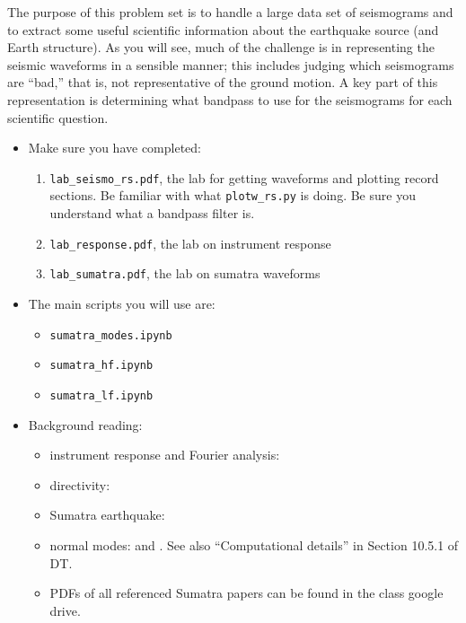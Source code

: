 \documentclass[11pt,titlepage,fleqn]{article}
\begin{document}
\begin{spacing}{1.0}

The purpose of this problem set is to handle a large data set of seismograms and to extract some useful scientific information about the earthquake source (and Earth structure). As you will see, much of the challenge is in representing the seismic waveforms in a sensible manner; this includes judging which seismograms are ``bad,'' that is, not representative of the ground motion. A key part of this representation is determining what bandpass to use for the seismograms for each scientific question.

\begin{itemize}


\item Make sure you have completed:
%
\begin{enumerate}
\item \verb+lab_seismo_rs.pdf+, the lab for getting waveforms and plotting record sections.
Be familiar with what \verb+plotw_rs.py+ is doing.
Be sure you understand what a bandpass filter is.

\item \verb+lab_response.pdf+, the lab on instrument response

\item \verb+lab_sumatra.pdf+, the lab on sumatra waveforms
\end{enumerate}


\item The main scripts you will use are:
%
\begin{itemize}
\item \verb+sumatra_modes.ipynb+
\item \verb+sumatra_hf.ipynb+
\item \verb+sumatra_lf.ipynb+
\end{itemize}


\item Background reading:

\begin{itemize}
\item instrument response and Fourier analysis: \citet[][Ch.~6]{SteinWysession}
\item directivity: \citet[][Section 4.3.2]{SteinWysession} 
\item Sumatra earthquake: \citet{Lay2005,Ammon2005,Park2005,Ni2005,SSteinOkal2007}
\item normal modes: \citet[][Section 2.9]{SteinWysession} and \citet[][Ch.~8]{DT}. See also ``Computational details'' in Section 10.5.1 of DT.
\item PDFs of all referenced Sumatra papers can be found in the class google drive.


\end{itemize}
\end{itemize}
\end{spacing}
\end{document}
